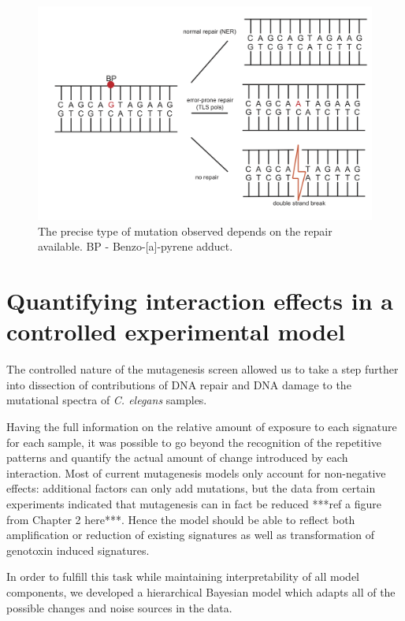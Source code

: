 \begin{figure}[h]
  \centering
\centerline{\includegraphics[width=1\textwidth]{figures/interaction_concept.png}}
  \caption{The precise type of mutation observed depends on the repair available. BP - Benzo-[a]-pyrene adduct.}
  \label{interaction_concept}
\end{figure}

\section{Quantifying interaction effects in a controlled experimental model}

The controlled nature of the mutagenesis screen allowed us to take a step further into dissection 
of contributions of DNA repair and DNA damage to the mutational spectra of \textit{C. elegans} samples.

Having the full information on the relative amount of exposure to each signature for each sample, it was possible to go beyond the recognition of the repetitive patterns and quantify the actual amount of change introduced by each interaction. Most of current mutagenesis models only account for non-negative effects: additional factors can only add mutations, but the data from certain experiments indicated that mutagenesis can in fact be reduced ***ref a figure from Chapter 2 here***. Hence the model should be able to reflect both amplification or reduction of existing signatures as well as transformation of genotoxin induced signatures.

In order to fulfill this task while maintaining interpretability of all model components, we developed a hierarchical Bayesian model which adapts all of the possible changes and noise sources in the data. 

